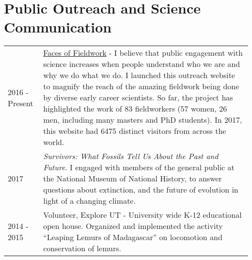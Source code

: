 \documentclass{article}
\begin{document}
\section*{Public Outreach and Science Communication}
\begin{longtable}{p{}p{}}
2016 - Present & \href{http://facesoffieldwork.com}{Faces of Fieldwork} - I believe that public engagement with science increases when people understand who we are and why we do what we do. I launched this outreach website to magnify the reach of the amazing fieldwork being done by diverse early career scientists. So far, the project has highlighted the work of 83 fieldworkers (57 women, 26 men, including many masters and PhD students). In 2017, this website had 6475 distinct visitors from across the world.\\[4pt]
2017 & \emph{Survivors: What Fossils Tell Us About the Past and Future}. I engaged with members of the general public at the National Museum of National History, to answer questions about extinction, and the future of evolution in light of a changing climate. \\[4pt]

2014 - 2015 & Volunteer, Explore UT - University wide K-12 educational open house. Organized and implemented the activity ``Leaping Lemurs of Madagascar'' on locomotion and conservation of lemurs.\\
\end{longtable}
\end{document}
